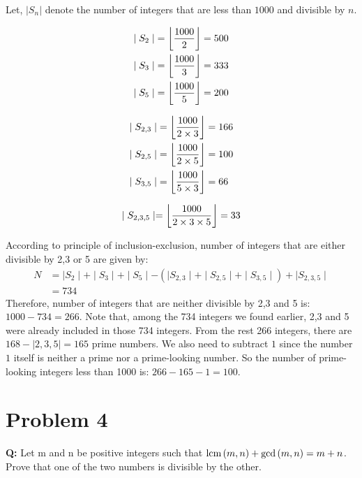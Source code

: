 Let, $|S_n|$ denote the number of integers that are less than $1000$ and divisible by $n$.\\
\begin{minipage}{.33\textwidth}
    \begin{align*}
        \mid S_2\mid & = \floor*{\frac{1000}{2}} = 500 \\
        \mid S_3\mid & = \floor*{\frac{1000}{3}} = 333 \\
        \mid S_5\mid & = \floor*{\frac{1000}{5}} = 200
    \end{align*}
\end{minipage}%
\begin{minipage}{0.33\textwidth}
    \begin{align*}
        \mid S_{2,3}\mid & = \floor*{\frac{1000}{2\times3}} = 166 \\
        \mid S_{2,5}\mid & = \floor*{\frac{1000}{2\times5}} = 100 \\
        \mid S_{3,5}\mid & = \floor*{\frac{1000}{5\times3}} = 66
    \end{align*}
\end{minipage}%
\begin{minipage}{0.33\textwidth}
    \[
        \mid S_{2,3,5}\mid  = \floor*{\frac{1000}{2\times3\times5}}= 33
    \]
\end{minipage}

According to principle of inclusion-exclusion, number of integers that are either divisible by 2,3 or 5 are given by:
\begin{align*}
    N & = \mid S_2\mid  + \mid S_3\mid  + \mid S_5\mid  - \left(\mid S_{2,3}\mid  + \mid S_{2,5}\mid  + \mid S_{3,5}\mid \right) + \mid S_{2,3,5}\mid \\
      & =734
\end{align*}
Therefore, number of integers that are neither divisible by 2,3 and 5 is: $1000-734=266$. Note that, among the 734 integers we found earlier, 2,3 and 5 were already included in those 734 integers. From the rest 266 integers, there are $168-|2,3,5| = 165$ prime numbers. We also need to subtract $1$ since the number $1$ itself is neither a prime nor a prime-looking number. So the number of prime-looking integers less than 1000 is: $266-165-1 = 100$.
\section*{Problem 4}
\textbf{Q:} Let m and n be positive integers such that $\lcm{m, n} + \gcd{m, n} = m + n$. Prove that one of the two numbers is divisible by the other.\\


